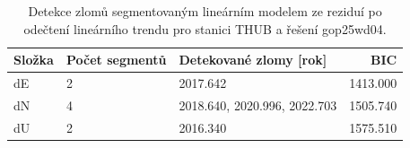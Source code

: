 \begin{table}[htbp]
\caption{Detekce zlomů segmentovaným lineárním modelem ze reziduí po odečtení lineárního trendu pro stanici THUB a řešení gop25wd04.}
\label{tab:gop25wd04_stcd_thub_detr_weighted_1seg_jumps_piecewise_bic}
\begin{tabular}{lllr}
\toprule
Složka & Počet segmentů & Detekované zlomy [rok] & BIC \\
\midrule
dE & 2 & 2017.642 & 1413.000 \\
dN & 4 & 2018.640, 2020.996, 2022.703 & 1505.740 \\
dU & 2 & 2016.340 & 1575.510 \\
\bottomrule
\end{tabular}
\end{table}
